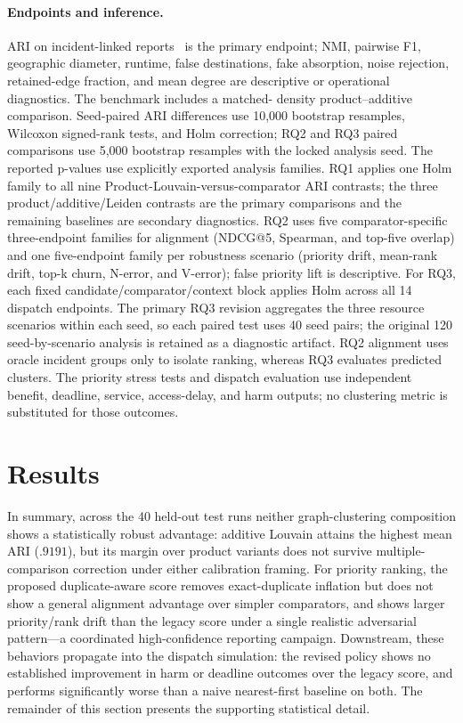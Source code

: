 \documentclass[runningheads]{llncs}
\begin{document}
\paragraph{Endpoints and inference.}
ARI on incident-linked reports~\cite{hubert1985comparing} is the primary
endpoint; NMI, pairwise F1, geographic diameter, runtime, false destinations,
fake absorption, noise rejection, retained-edge fraction, and mean degree are
descriptive or operational diagnostics. The benchmark includes a matched-
density product--additive comparison. Seed-paired ARI differences use 10,000
bootstrap resamples, Wilcoxon signed-rank tests, and Holm correction; RQ2
and RQ3 paired comparisons use 5,000 bootstrap resamples with the locked
analysis seed. The
reported p-values use explicitly exported analysis families. RQ1 applies one
Holm family to all nine Product-Louvain-versus-comparator ARI contrasts; the
three product/additive/Leiden contrasts are the primary comparisons and the
remaining baselines are secondary diagnostics. RQ2 uses five
comparator-specific three-endpoint families for alignment (NDCG@5, Spearman,
and top-five overlap) and one five-endpoint family per robustness scenario
(priority drift, mean-rank drift, top-k churn, N-error, and V-error); false
priority lift is descriptive. For RQ3, each fixed candidate/comparator/context
block applies Holm across all 14 dispatch endpoints. The primary RQ3 revision
aggregates the three resource scenarios within each seed, so each paired test
uses 40 seed pairs; the original 120 seed-by-scenario analysis is retained as
a diagnostic artifact. RQ2 alignment uses oracle incident groups only to
isolate ranking, whereas RQ3 evaluates predicted clusters. The priority stress
tests and dispatch evaluation use independent benefit, deadline, service,
access-delay, and harm outputs; no clustering metric is substituted for those
outcomes.

\section{Results}
\label{sec:results}

In summary, across the 40 held-out test runs neither graph-clustering
composition shows a statistically robust advantage: additive Louvain attains
the highest mean ARI ($.9191$), but its margin over product variants does not
survive multiple-comparison correction under either calibration framing. For
priority ranking, the proposed duplicate-aware score removes exact-duplicate
inflation but does not show a general alignment advantage over simpler
comparators, and shows larger priority/rank drift than the legacy score under
a single realistic adversarial pattern---a coordinated high-confidence
reporting campaign. Downstream, these behaviors propagate into the dispatch
simulation: the revised policy shows no established improvement in harm or
deadline outcomes over the legacy score, and performs significantly worse
than a naive nearest-first baseline on both. The remainder of this section
presents the supporting statistical detail.
\end{document}
